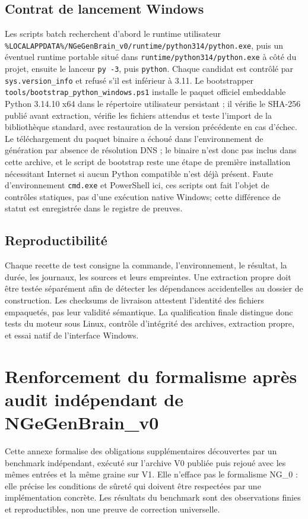 \documentclass[11pt,a4paper,openany]{book}
\newcommand{\code}[1]{\texttt{#1}}
\theoremstyle{definition}
\theoremstyle{plain}
\theoremstyle{remark}
\begin{document}
\section{Contrat de lancement Windows}
Les scripts batch recherchent d’abord le runtime utilisateur \code{\%LOCALAPPDATA\%/NGeGenBrain\_v0/runtime/python314/python.exe}, puis un éventuel runtime portable situé dans \code{runtime/python314/python.exe} à côté du projet, ensuite le lanceur \code{py -3}, puis \code{python}. Chaque candidat est contrôlé par \code{sys.version\_info} et refusé s’il est inférieur à 3.11. Le bootstrapper \code{tools/bootstrap\_python\_windows.ps1} installe le paquet officiel embeddable Python 3.14.10 x64 dans le répertoire utilisateur persistant ; il vérifie le SHA-256 publié avant extraction, vérifie les fichiers attendus et teste l’import de la bibliothèque standard, avec restauration de la version précédente en cas d’échec. Le téléchargement du paquet binaire a échoué dans l’environnement de génération par absence de résolution DNS ; le binaire n’est donc pas inclus dans cette archive, et le script de bootstrap reste une étape de première installation nécessitant Internet si aucun Python compatible n’est déjà présent. Faute d’environnement \code{cmd.exe} et PowerShell ici, ces scripts ont fait l’objet de contrôles statiques, pas d’une exécution native Windows; cette différence de statut est enregistrée dans le registre de preuves.

\section{Reproductibilité}
Chaque recette de test consigne la commande, l'environnement, le résultat, la durée, les journaux, les sources et leurs empreintes. Une extraction propre doit être testée séparément afin de détecter les dépendances accidentelles au dossier de construction. Les checksums de livraison attestent l'identité des fichiers empaquetés, pas leur validité sémantique. La qualification finale distingue donc tests du moteur sous Linux, contrôle d'intégrité des archives, extraction propre, et essai natif de l'interface Windows.



\chapter{Renforcement du formalisme après audit indépendant de NGeGenBrain\_v0}
\label{ch:audit-independant-v1}

Cette annexe formalise des obligations supplémentaires découvertes par un benchmark indépendant, exécuté sur l'archive V0 publiée puis rejoué avec les mêmes entrées et la même graine sur V1. Elle n'efface pas le formalisme NG\_0 : elle précise les conditions de sûreté qui doivent être respectées par une implémentation concrète. Les résultats du benchmark sont des observations finies et reproductibles, non une preuve de correction universelle.
\end{document}
